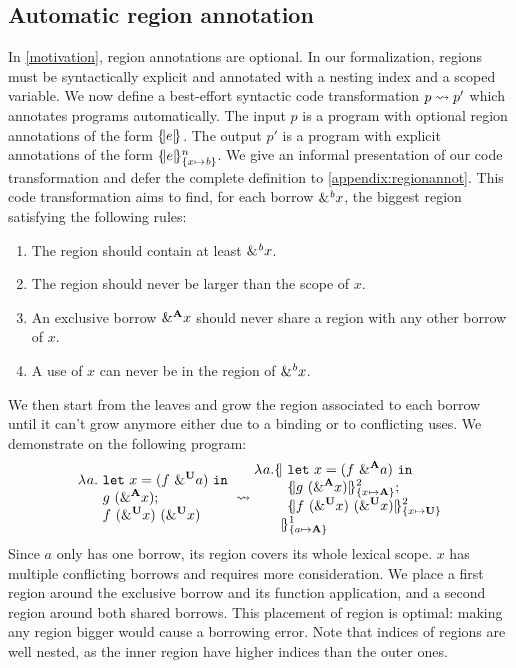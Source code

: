 
\subsection{Automatic region annotation}
\label{regionannot}

In \cref{motivation}, region annotations are optional.
In our formalization, regions must be syntactically explicit and annotated with
a nesting index and a scoped variable.
We now define a best-effort
syntactic code transformation $\RannotT{p}{p'}$ which
annotates programs automatically.
The input $p$ is a program with optional region annotations of the form $\region[]{}{e}$.
The output $p'$ is a program with explicit annotations
of the form $\region{\Sone x\BORROW}{e}$.
We give an informal presentation of our code transformation and defer
the complete definition to \cref{appendix:regionannot}. This code transformation
aims to find, for each borrow $\borrow{x}$, the biggest region satisfying
the following rules:
\begin{enumerate}
\item The region should contain at least $\borrow{x}$.
\item The region should never be larger than the scope of $x$.
\item An exclusive borrow $\borrow[\kaff]{x}$ should never share a region with any other borrow of $x$.
\item A use of $x$ can never be in the region of $\borrow{x}$.
\end{enumerate}
We then start from the leaves and grow the region
associated to each borrow until it can't grow anymore either due to a binding
or to conflicting uses. We demonstrate
on the following program:
%
\[
  \setlength{\jot}{-1pt}
  \RannotT{
\begin{aligned}
  \lam{a}{}\ &
  \letin{x}{\app{f}{\borrow[\kun]{a}}}{}\\
  &g\ (\borrow[\kaff]{x});\\
  &f\ (\borrow[\kun]{x})\ (\borrow[\kun]{x})\\
\end{aligned}
}{
\begin{aligned}
  \lam{a}{}\region[1]{\Sone a\MBORROW}{\ &%
  \letin{x}{\app{f}{\borrow[\kaff]{a}}}{}\\
  &\region[2]{\Sone x\MBORROW}{g\ (\borrow[\kaff]{x})};\\
  &\region[2]{\Sone x\IBORROW}{f\ (\borrow[\kun]{x})\ (\borrow[\kun]{x})}\\
  &\!\!\!}
\end{aligned}
}
\]
%
Since $a$ only has one borrow, its region covers its whole lexical scope.
$x$ has multiple conflicting borrows and requires more consideration.
We place a first
region around the exclusive borrow and its function application,
and a second region around both shared borrows. This placement of region
is optimal: making any region bigger would cause a borrowing
error.
Note that indices of regions are well nested, as the inner region have
higher indices than the outer ones.

